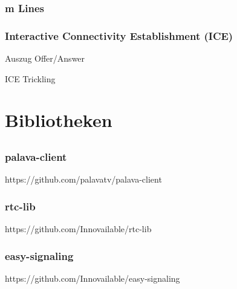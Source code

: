 \documentclass[12pt]{beamer}
\begin{document}
\begin{frame}
  \frametitle{m Lines}



\end{frame}

\begin{frame}
  \frametitle{Interactive Connectivity Establishment (ICE)}
  \pause
  
  \hfill \tiny Auszug Offer/Answer
  \vspace{15pt}
  \pause
  
  
  \hfill \tiny ICE Trickling
\end{frame}


\section{Bibliotheken}
\subsection{} 

\begin{frame}
  \frametitle{palava-client}
  \pause
  
  \hfill \tiny https://github.com/palavatv/palava-client
\end{frame}

\begin{frame}
  \frametitle{rtc-lib}
  \pause
  
  \hfill \tiny https://github.com/Innovailable/rtc-lib
\end{frame}

\begin{frame}
  \frametitle{easy-signaling}
  \pause
  
  \hfill \tiny https://github.com/Innovailable/easy-signaling
\end{frame}
\end{document}
